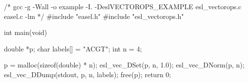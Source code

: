 \begin{cchunk}
/*   gcc -g -Wall -o example -I. -DeslVECTOROPS_EXAMPLE esl_vectorops.c easel.c -lm   */
#include "easel.h"
#include "esl_vectorops.h"

int main(void)
{
  double *p;
  char    labels[] = "ACGT";
  int     n = 4;

  p = malloc(sizeof(double) * n);
  esl_vec_DSet(p, n, 1.0);
  esl_vec_DNorm(p, n);
  esl_vec_DDump(stdout, p, n, labels);
  free(p);
  return 0;
}
\end{cchunk}
